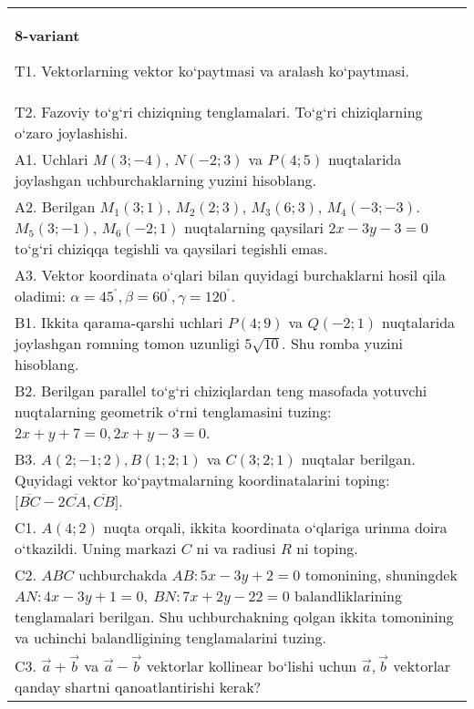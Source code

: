 \documentclass{article}
\begin{document}
\begin{tabular}{m{17cm}}
\textbf{8-variant}
\newline

T1. 
Vektorlarning vektor ko‘paytmasi va aralash ko‘paytmasi.
 \\
T2. 
Fazoviy to‘g‘ri chiziqning tenglamalari. To‘g‘ri chiziqlarning o‘zaro joylashishi.
 \\
A1. 
Uchlari $M (3;-4) $, $N (-2;3) $ va $P (4;5) $
nuqtalarida joylashgan uchburchaklarning yuzini hisoblang.
 \\
A2. Berilgan $M_1 (3; 1) $, $M_2 (2; 3) $, $M_3 (6; 3) $,
$M_4 (-3;-3) $. $M_5 (3;-1) $, $M_6 (-2; 1) $ nuqtalarning qaysilari
$2x-3y-3 = 0$ to‘g‘ri chiziqqa tegishli va qaysilari tegishli
emas.
 \\
A3. Vektor koordinata o‘qlari bilan quyidagi burchaklarni hosil qila oladimi:
$\alpha = 45^{{^\circ}},\beta = 60^{{^\circ}},\gamma = 120^{{^\circ}}$.
 \\
B1. Ikkita qarama-qarshi uchlari \(P (4;9) \) va \(Q (-2; 1) \) nuqtalarida joylashgan romning tomon uzunligi \(5\sqrt{10}\). Shu
romba yuzini hisoblang.
 \\
B2. 
Berilgan parallel to‘g‘ri chiziqlardan teng masofada yotuvchi
nuqtalarning geometrik o‘rni tenglamasini tuzing: $2x+y+7=0, 2x+y-3=0$.
 \\
B3. 
$A (2; -1;2),B (1;2; 1) $ va $C (3;2;1) $ nuqtalar berilgan. Quyidagi vektor ko‘paytmalarning koordinatalarini toping:
$\lbrack\overline{BC} - 2\overline{CA},\overline{CB}\rbrack$. \\
C1. \(A (4;2) \) nuqta orqali, ikkita koordinata o‘qlariga
urinma doira o‘tkazildi. Uning markazi $C$ ni va radiusi
$R$ ni toping.
 \\
C2. 
$ABC$ uchburchakda \(AB:5x-3y+2=0\)
tomonining, shuningdek \(AN:4x - 3y + 1 = 0,\ BN:7x + 2y - 22 = 0\)
balandliklarining tenglamalari berilgan. Shu uchburchakning qolgan ikkita
tomonining va uchinchi balandligining tenglamalarini tuzing.
 \\
C3. 
\(\vec{a}+\vec{b}\) va \(\vec{a} - \vec{b}\) vektorlar kollinear bo‘lishi uchun \(\vec{a},\vec{b}\) vektorlar qanday shartni qanoatlantirishi kerak?
 \\

\end{tabular}
\vspace{1cm}
\end{document}
